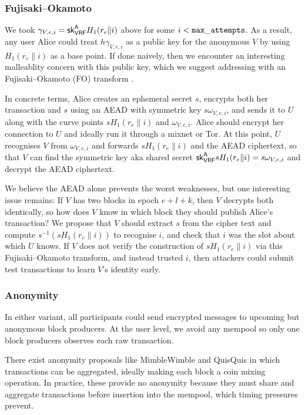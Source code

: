 \subsubsection{Fujisaki–Okamoto}

We took $\gamma_{V,e,i} = \mathsf{sk}_{\mathsf{VRF}}^{\mathsf{A}} H_1(r_e \| i)$ above for some $i < \mathtt{max\_attempts}$.  As a result, any user Alice could treat $h \gamma_{V,e,i}$ as a public key for the anonymous $V$ by using $H_1(r_e \| i)$ as a base point.  If done naively, then we encounter an interesting malleablity concern with this public key, which we suggest addressing with an Fujisaki–Okamoto (FO) transform \cite{FO_transform}.  

In concrete terms, Alice creates an ephemeral secret $s$, encrypts both her transaction and $s$ using an AEAD with symmetric key $s \omega_{V,e,i}$, and sends it to $U$ along with the curve points $s H_1(r_e \| i)$ and $\omega_{V,e,i}$.  Alice should encrypt her connection to $U$ and ideally run it through a mixnet or Tor.  At this point, $U$ recognises $V$ from $\omega_{V,e,i}$ and forwards $s H_1(r_e \| i)$ and the AEAD ciphertext, so that $V$ can find the symmetric key aka shared secret $\mathsf{sk}_{\mathsf{VRF}}^{\mathsf{A}} s H_1(r_e \| i) = s \omega_{V,e,i}$ and decrypt the AEAD ciphertext.

We believe the AEAD alone prevents the worst weaknesses, but one interesting issue remains:  If $V$ has two blocks in epoch $e+l+k$, then $V$ decrypts both identically, so how does $V$ know in which block they should publish Alice's transaction?  We propose that $V$ should extract $s$ from the cipher text and compute $s^{-1} (s H_1(r_e \| i))$ to recognise $i$, and check that $i$ was the slot about which $U$ knows.  If $V$ does not verify the construction of $s H_1(r_e \| i)$ via this Fujisaki–Okamoto transform, and instead trusted $i$, then attackers could submit test transactions to learn $V$'s identity early. 


\subsubsection{Anonymity}

In either variant, all participants could send encrypted messages to upcoming but anonymous block producers.  At the user level, we avoid any mempool so only one block producers observes each raw transaction.  

There exist anonymity proposals like MimbleWimble \cite{MimbleWimble} and QuisQuis \cite{QuisQuis} in which transactions can be aggregated, ideally making each block a coin mixing operation.  In practice, these provide no anonymity because they must share and aggregate transactions before insertion into the mempool, which timing pressures prevent.  

